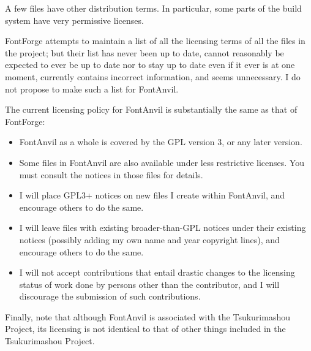 \documentclass[11pt]{report}
\begin{document}
A few files have other distribution terms.  In particular, some parts of the
build system have very permissive licenses.

FontForge attempts to maintain a list of all the licensing terms of all the
files in the project; but their list has never been up to date, cannot
reasonably be expected to ever be up to date nor to stay up to date even if
it ever is at one moment, currently contains incorrect information, and
seems unnecessary.  I do not propose to make such a list for FontAnvil.

The current licensing policy for FontAnvil is substantially the same as that
of FontForge:
\begin{itemize}
\item FontAnvil as a whole is covered by the GPL version 3, or any later
version.
\item Some files in FontAnvil are also available under less restrictive
licenses.  You must consult the notices in those files for details.
\item I will place GPL3+ notices on new files I create within FontAnvil,
and encourage others to do the same.
\item I will leave files with existing broader-than-GPL notices under their
existing notices (possibly adding my own name and year copyright lines), and
encourage others to do the same.
\item I will not accept contributions that entail drastic changes to the
licensing status of work done by persons other than the contributor, and I
will discourage the submission of such contributions.
\end{itemize}

Finally, note that although FontAnvil is associated with the Tsukurimashou
Project, its licensing is not identical to that of other things included in
the Tsukurimashou Project.
\clearpage

\end{document}
